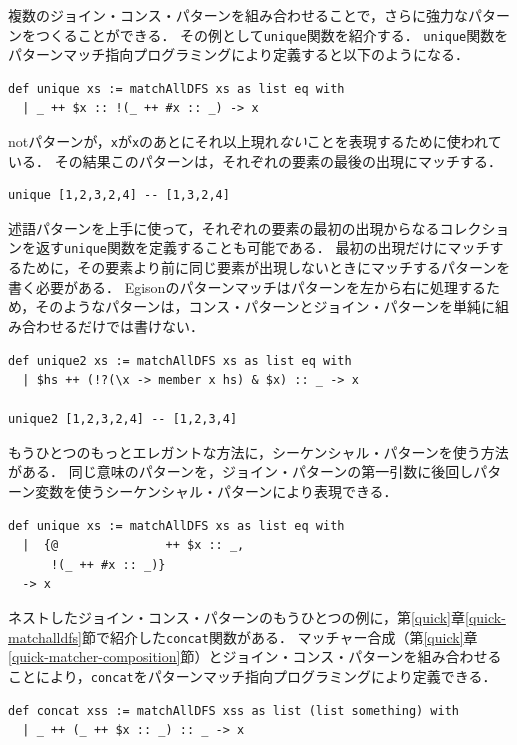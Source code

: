 複数のジョイン・コンス・パターンを組み合わせることで，さらに強力なパターンをつくることができる．
その例として\lstinline{unique}関数を紹介する．
\lstinline{unique}関数をパターンマッチ指向プログラミングにより定義すると以下のようになる．
\begin{lstlisting}[language=egison,numbers=none]
def unique xs := matchAllDFS xs as list eq with
  | _ ++ $x :: !(_ ++ #x :: _) -> x
\end{lstlisting}
notパターンが，\lstinline{x}が\lstinline{x}のあとにそれ以上現れ\emph{ない}ことを表現するために使われている．
その結果このパターンは，それぞれの要素の最後の出現にマッチする．
\begin{lstlisting}[language=egison,numbers=none]
unique [1,2,3,2,4] -- [1,3,2,4]
\end{lstlisting}

述語パターンを上手に使って，それぞれの要素の最初の出現からなるコレクションを返す\lstinline{unique}関数を定義することも可能である．
最初の出現だけにマッチするために，その要素より前に同じ要素が出現しないときにマッチするパターンを書く必要がある．
Egisonのパターンマッチはパターンを左から右に処理するため，そのようなパターンは，コンス・パターンとジョイン・パターンを単純に組み合わせるだけでは書けない．
\begin{lstlisting}[language=egison,numbers=none]
def unique2 xs := matchAllDFS xs as list eq with
  | $hs ++ (!?(\x -> member x hs) & $x) :: _ -> x

unique2 [1,2,3,2,4] -- [1,2,3,4]
\end{lstlisting}

もうひとつのもっとエレガントな方法に，シーケンシャル・パターンを使う方法がある．
同じ意味のパターンを，ジョイン・パターンの第一引数に後回しパターン変数を使うシーケンシャル・パターンにより表現できる．
\begin{lstlisting}[language=egison,numbers=none]
def unique xs := matchAllDFS xs as list eq with
  |  {@               ++ $x :: _,
      !(_ ++ #x :: _)}
  -> x
\end{lstlisting}

ネストしたジョイン・コンス・パターンのもうひとつの例に，第\ref{quick}章\ref{quick-matchalldfs}節で紹介した\lstinline{concat}関数がある．
マッチャー合成（第\ref{quick}章\ref{quick-matcher-composition}節）とジョイン・コンス・パターンを組み合わせることにより，\lstinline{concat}をパターンマッチ指向プログラミングにより定義できる．
\begin{lstlisting}[language=egison,numbers=none]
def concat xss := matchAllDFS xss as list (list something) with
  | _ ++ (_ ++ $x :: _) :: _ -> x
\end{lstlisting}


